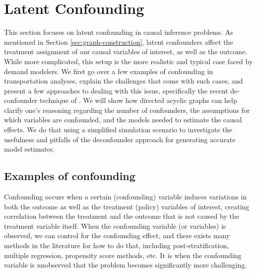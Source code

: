 \section{Latent Confounding}
\label{sec:latent-confounding}

This section focuses on latent confounding in causal inference problems.
As mentioned in Section \ref{sec:graph-construction},  latent confounders affect the treatment assignment of our causal variables of interest, as well as the outcome.
While more complicated, this setup is the more realistic and typical case faced by demand modelers.
We first go over a few examples of confounding in transportation analyses, explain
the challenges that come with such cases, and present a few approaches to
dealing with this issue, specifically the recent de-confounder technique of
\citet{wang_2019_blessings}.
We will show how directed acyclic graphs can
help clarify one's reasoning regarding the number of
confounders, the assumptions for which variables are confounded, and the models
needed to estimate the causal effects.
We do that using a simplified simulation scenario to investigate the usefulness
and pitfalls of the deconfounder approach for generating accurate model estimates.


\subsection{Examples of confounding}
\label{sec:confounding-examples}

Confounding occurs when a certain (confounding) variable induces variations in
both the outcome as well as the treatment (policy) variables of interest,
creating correlation between the treatment and the outcome that is not caused
by the treatment variable itself. When the confounding variable (or variables) is
observed, we can control for the confounding effect, and there exists many
methods in the literature for how to do that, including post-stratification,
multiple regression, propensity score methods, etc. It is when the
confounding variable is unobserved that the problem becomes significantly
more challenging.

